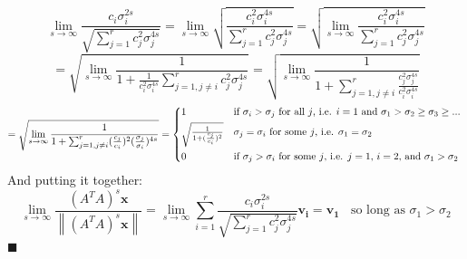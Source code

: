 \documentclass{tufte-handout}
\newcommand{\norm}[1]{\left\lVert#1\right\rVert}
\renewcommand{\qedsymbol}{$\blacksquare$}
\begin{document}
\[\lim_{s\rightarrow\infty}\frac{c_i\sigma_{i}^{2s}}{\sqrt{\sum_{j=1}^rc_j^2\sigma_{j}^{4s}}}
=
\lim_{s\rightarrow\infty}\sqrt{\frac{c_i^2\sigma_{i}^{4s}}{\sum_{j=1}^rc_j^2\sigma_{j}^{4s}}}
=
\sqrt{\lim_{s\rightarrow\infty}\frac{c_i^2\sigma_{i}^{4s}}{\sum_{j=1}^rc_j^2\sigma_{j}^{4s}}}
\]
\[
=
\sqrt{\lim_{s\rightarrow\infty}\frac{1}{1+\frac{1}{c_i^2\sigma_{i}^{4s}}\sum_{j=1,j\ne i}^rc_j^2\sigma_{j}^{4s}}}
=
\sqrt{\lim_{s\rightarrow\infty}\frac{1}{1+\sum_{j=1,j\ne i}^r\frac{c_j^2\sigma_{j}^{4s}}{c_i^2\sigma_{i}^{4s}}}}
\]
\[
=
\sqrt{\lim_{s\rightarrow\infty}\frac{1}{1+\sum_{j=1,j\ne i}^r(\frac{c_j}{c_i})^2(\frac{\sigma_{j}}{\sigma_{i}})^{4s}}}
=
\begin{cases*}
1&if $\sigma_{i}>\sigma_{j}$ for all $j$, i.e. $i=1$ and $\sigma_{1}>\sigma_{2}\geq\sigma_{3}\geq...$\\
\sqrt{\frac{1}{1+(\frac{c_j}{c_i})^2}}&$\sigma_{j}=\sigma_{i}$ for some $j$, i.e. $\sigma_{1}=\sigma_{2}$\\
0&if $\sigma_{j}>\sigma_{i}$ for some $j$, i.e. $j=1,$ $i=2$, and $\sigma_{1}>\sigma_{2}$
\end{cases*}
\]
And putting it together:
\[
\lim_{s\rightarrow\infty}\frac{(A^TA)^s\mathbf{x}}{\norm{(A^TA)^s\mathbf{x}}}
=
\lim_{s\rightarrow\infty}\sum_{i=1}^r\frac{c_i\sigma_{i}^{2s}}{\sqrt{\sum_{j=1}^rc_j^2\sigma_{j}^{4s}}}\mathbf{v_i}
=\mathbf{v_1}~~~~\text{so long as }\sigma_{1}>\sigma_{2}
\]
\qedsymbol
\[\]
\end{document}
